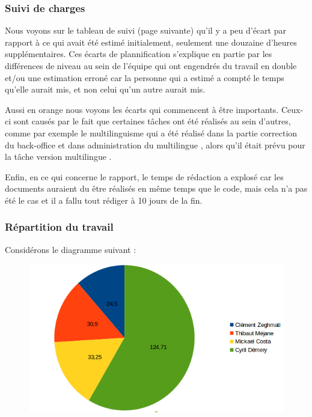 \documentclass[11pt]{report}
\begin{document}
\subsubsection*{Suivi de charges}
Nous voyons sur le tableau de suivi (page suivante) qu'il y a peu d'écart par 
rapport à ce qui 
avait été estimé initialement, seulement une douzaine d'heures supplémentaires. 
Ces écarts de plannification s'explique en partie par les différences de niveau 
au sein de l'équipe qui ont engendrés du travail en double et/ou une estimation 
erroné car la personne qui a estimé a compté le temps qu'elle aurait mis, et 
non celui qu'un autre aurait mis. \\

\par Aussi en orange nous voyons les écarts qui commencent à être importants. 
Ceux-ci sont causés par le fait que certaines tâches ont été réalisés au sein 
d'autres, comme par exemple le multilinguisme qui a été réalisé dans la partie 
\og correction du back-office \fg{} et dans  \og administration du multilingue 
\fg{}, alors qu'il était prévu pour la tâche \og version multilingue \fg{}.

\par Enfin, en ce qui concerne le rapport, le temps de rédaction a explosé car 
les documents auraient du être réalisés en même temps que le code, mais cela 
n'a pas été le cas et il a fallu tout rédiger à 10 jours de la fin.


\subsubsection*{Répartition du travail}
Considérons le diagramme suivant : \\
\begin{figure}[H] 
\includegraphics[scale=0.5]{include/temps_projet.png}
\end{figure}
\end{document}
